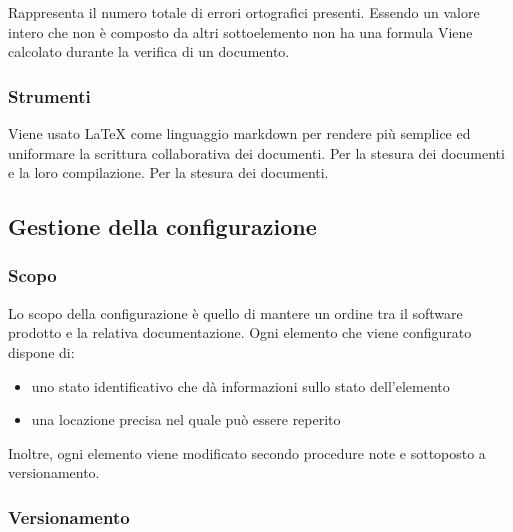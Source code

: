         Rappresenta il numero totale di errori ortografici presenti. Essendo un valore intero che non è composto da altri sottoelemento non ha una formula
        Viene calcolato durante la verifica di un documento.
	    
	    
	    \subsubsection{Strumenti}
	    Viene usato LaTeX come linguaggio markdown per rendere più semplice ed uniformare la scrittura collaborativa dei documenti.
	    Per la stesura dei documenti e la loro compilazione.
	    Per la stesura dei documenti.
	
	\subsection{Gestione della configurazione}
		
		\subsubsection{Scopo}
		Lo scopo della configurazione è quello di mantere un ordine tra il software prodotto e la relativa documentazione. Ogni elemento che viene configurato dispone di:
			\begin{itemize}
				\item uno stato identificativo che dà informazioni sullo stato dell'elemento
				\item una locazione precisa nel quale può essere reperito
			\end{itemize}
		Inoltre, ogni elemento viene modificato secondo procedure note e sottoposto a versionamento.
		
		\subsubsection{Versionamento}
			
